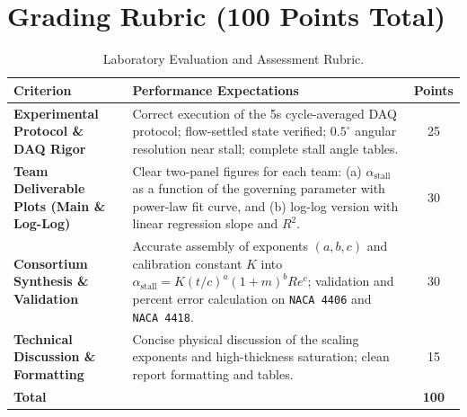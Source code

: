 \documentclass[11pt,a4paper]{article}
\begin{document}
\section{Grading Rubric (100 Points Total)}

\begin{table}[H]
\centering
\small
\renewcommand{\arraystretch}{1.2}
\begin{tabular}{@{}>{\raggedright\arraybackslash}p{3.8cm}>{\raggedright\arraybackslash}p{9.4cm}c@{}}
\toprule
\textbf{Criterion} & \textbf{Performance Expectations} & \textbf{Points} \\ \midrule
\textbf{Experimental Protocol \& DAQ Rigor} & Correct execution of the 5s cycle-averaged DAQ protocol; flow-settled state verified; $0.5^\circ$ angular resolution near stall; complete stall angle tables. & 25 \\
\textbf{Team Deliverable Plots (Main \& Log-Log)} & Clear two-panel figures for each team: (a) $\alpha_{\text{stall}}$ as a function of the governing parameter with power-law fit curve, and (b) log-log version with linear regression slope and $R^2$. & 30 \\
\textbf{Consortium Synthesis \& Validation} & Accurate assembly of exponents $(a, b, c)$ and calibration constant $K$ into $\alpha_{\text{stall}} = K (t/c)^a (1+m)^b Re^c$; validation and percent error calculation on \texttt{NACA 4406} and \texttt{NACA 4418}. & 30 \\
\textbf{Technical Discussion \& Formatting} & Concise physical discussion of the scaling exponents and high-thickness saturation; clean report formatting and tables. & 15 \\ \midrule
\textbf{Total} & & \textbf{100} \\ \bottomrule
\end{tabular}
\caption{Laboratory Evaluation and Assessment Rubric.}
\label{tab:rubric}
\end{table}
\end{document}
